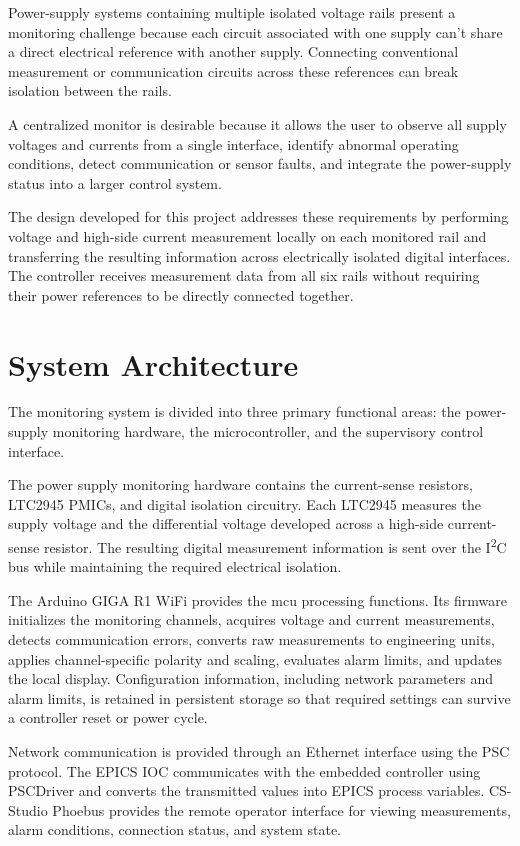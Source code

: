 Power-supply systems containing multiple isolated voltage rails present a
monitoring challenge because each circuit associated with one supply
can't share a direct electrical reference with another supply.
Connecting conventional measurement or communication circuits across these
references can break isolation between the rails.

A centralized monitor is desirable because it allows the user to observe all supply voltages and currents from a single interface,
identify abnormal operating conditions, detect communication or sensor faults,
and integrate the power-supply status into a larger control system.

The design developed for this project addresses these requirements by
performing voltage and high-side current measurement locally on each monitored
rail and transferring the resulting information across electrically isolated
digital interfaces. The controller receives measurement data from all
six rails without requiring their power references to be directly connected
together.


\section{System Architecture}

The monitoring system is divided into three primary functional areas:
the power-supply monitoring hardware, the microcontroller, and the
supervisory control interface.

The power supply monitoring hardware contains the current-sense resistors,
LTC2945 PMICs, and digital isolation circuitry. Each LTC2945 measures the supply
voltage and the differential voltage developed across a high-side current-sense
resistor. The resulting digital measurement information is sent over the I\textsuperscript{2}C bus while maintaining the required electrical isolation.

The Arduino GIGA R1 WiFi provides the mcu processing functions. Its
firmware initializes the monitoring channels, acquires voltage and current
measurements, detects communication errors, converts raw measurements to
engineering units, applies channel-specific polarity and scaling, evaluates
alarm limits, and updates the local display. Configuration information,
including network parameters and alarm limits, is retained in persistent
storage so that required settings can survive a controller reset or power
cycle.

Network communication is provided through an Ethernet interface using the PSC
protocol. The EPICS IOC communicates with the embedded controller using
PSCDriver and converts the transmitted values into EPICS process variables.
CS-Studio Phoebus provides the remote operator interface for viewing
measurements, alarm conditions, connection status, and system state.


